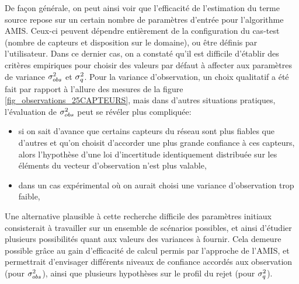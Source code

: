 De façon générale, on peut ainsi voir que l'efficacité de l'estimation du terme source repose sur un certain nombre de paramètres d'entrée pour l'algorithme AMIS. Ceux-ci peuvent dépendre entièrement de la configuration du cas-test (nombre de capteurs et disposition sur le domaine), ou être définis  par l'utilisateur. Dans ce dernier cas, on a constaté qu'il est difficile d'établir des critères empiriques pour choisir des valeurs par défaut à affecter aux paramètres de variance ${\sigma_{obs}^2}$ et $\sigma_q^2$. Pour la variance d'observation, un choix qualitatif a été fait par rapport à l'allure des mesures de la figure \ref{fig_observations_25CAPTEURS}, mais dans d'autres situations pratiques, l'évaluation de ${\sigma_{obs}^2}$ peut se révéler plus compliquée:
\begin{itemize}
	\item si on sait d'avance que certains capteurs du réseau sont plus fiables que d'autres et qu'on choisit d'accorder une plus grande confiance à ces capteurs, alors l'hypothèse d'une loi d'incertitude identiquement distribuée sur les éléments du vecteur d'observation n'est plus valable,
	\item dans un cas expérimental où on aurait choisi une variance d'observation trop faible,
\end{itemize}

Une alternative plausible à cette recherche difficile des paramètres initiaux consisterait à travailler sur un ensemble de scénarios possibles, et ainsi d'étudier plusieurs possibilités quant aux valeurs des variances à fournir. Cela demeure possible grâce au gain d'efficacité de calcul permis par l'approche  de l'AMIS, et permettrait d'envisager différents niveaux de confiance accordés aux observation (pour ${\sigma_{obs}^2}$), ainsi que plusieurs hypothèses sur le profil du rejet (pour $\sigma_q^2$). 



 
 
 




